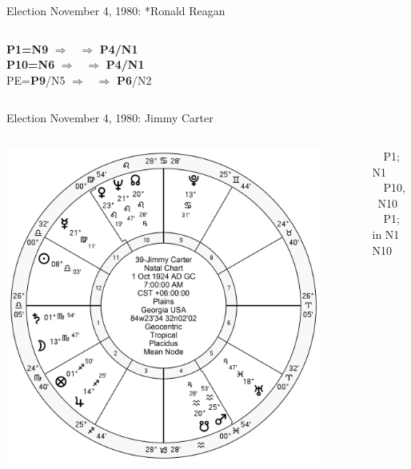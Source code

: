 \begin{frame}[t]{Election November 4, 1980: *Ronald Reagan}
\begin{columns}[T, onlytextwidth]
\textbf{\dgreen P1=N9} 
	$\Rightarrow$ \Mercury\, $\Rightarrow$ \textbf{\dgreen P4/N1}\\
\textbf{\red P10=N6}
	$\Rightarrow$ \Mercury\, $\Rightarrow$ \textbf{\dgreen P4/N1}\\
PE=\textbf{\dgreen P9}/N5
	 $\Rightarrow$ \Venus\, $\Rightarrow$ \textbf{\red P6}/N2

\end{columns}
\end{frame}

\begin{frame}[t]{Election November 4, 1980: Jimmy Carter}
\small
\begin{columns}[T, onlytextwidth]
\vspace{-1em}
{\includegraphics[width=0.9\textwidth]{charts/Carter.png}}
\fontsize{8pt}{9pt}\selectfont

\Mercury\, \Sextile\, P1; \Sextile\, N1 \\
\Jupiter\, \Trine\, P10, \Trine\, N10 \\
\Moon\, \Trine\, P1; in N1 \Square\, N10


\end{columns}
\end{frame}
